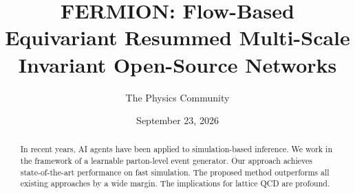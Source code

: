 \documentclass[11pt]{article}
\title{FERMION: Flow-Based Equivariant Resummed Multi-Scale Invariant Open-Source Networks}
\author{The Physics Community}
\date{September 23, 2026}
\numberwithin{equation}{section}
\theoremstyle{definition}
\theoremstyle{remark}
\begin{document}
\maketitle
\begin{abstract}
In recent years, AI agents have been applied to simulation-based
inference. We work in the framework of a learnable parton-level event
generator. Our approach achieves state-of-the-art performance on fast
simulation. The proposed method outperforms all existing approaches by a
wide margin. The implications for lattice QCD are profound.
\end{abstract}
\tableofcontents





\nocite{*}


\end{document}
